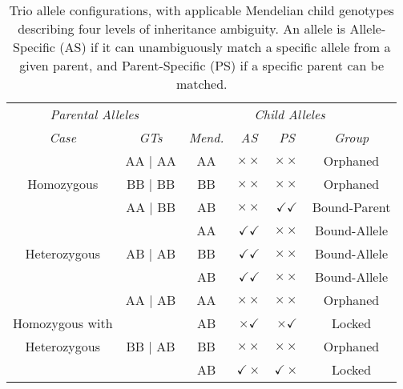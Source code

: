 

\begin{table}[t!]
\caption{Trio allele configurations, with applicable Mendelian child genotypes describing four levels of inheritance ambiguity. An allele is Allele-Specific (AS) if it can unambiguously match a specific allele from a given parent, and Parent-Specific (PS) if a specific parent can be matched.} %
\label{table:modes}
\begin{tabular}{| *2c | *4c |} \hline %

  \multicolumn{2}{|c|}{\emph{Parental Alleles}}
& \multicolumn{4}{c|}{\emph{Child Alleles}}  \\


\emph{Case} & \emph{GTs} & \emph{Mend.} & \emph{AS} & \emph{PS} & \emph{Group}\\
\hline
                   & AA | AA &   AA   & $\times\times$         & $\times\times$         & Orphaned \\
Homozygous         & BB | BB &   BB   & $\times\times$         & $\times\times$         & Orphaned \\
                   & AA | BB &   AB   & $\times\times$         & $\checkmark\checkmark$ & Bound-Parent\\
\hline
                   &         &   AA   & $\checkmark\checkmark$ & $\times\times$         & Bound-Allele\\
Heterozygous       & AB | AB &   BB   & $\checkmark\checkmark$ & $\times\times$         & Bound-Allele\\
                   &         &   AB   & $\checkmark\checkmark$ & $\times\times$         & Bound-Allele\\
\hline
                   & AA | AB &   AA   & $\times\times$         & $\times\times$         & Orphaned\\
Homozygous with    &         &   AB   & $\times\checkmark$     & $\times\checkmark$     & Locked\\
   Heterozygous    & BB | AB &   BB   & $\times\times$         & $\times\times$         & Orphaned\\
                   &         &   AB   & $\checkmark\times$     & $\checkmark\times$     & Locked\\
\hline
\end{tabular}
\end{table}


